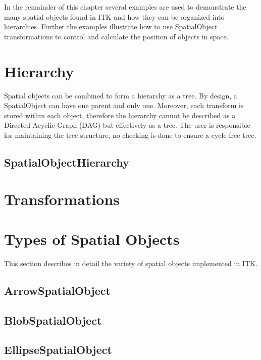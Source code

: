 In the remainder of this chapter several examples are used to demonstrate
the many spatial objects found in ITK and how they can be organized into
hierarchies. Further the examples
illustrate how to use SpatialObject transformations to control and
calculate the position of objects in space.

\section{Hierarchy}

Spatial objects can be combined to form a hierarchy as a tree. By design, a SpatialObject can
have one parent and only one. Moreover, each transform is stored within each object,
therefore the hierarchy cannot
be described as a Directed Acyclic Graph (DAG) but effectively as a tree.
The user is responsible for maintaining the tree structure, no checking is done
to ensure a cycle-free tree.

\subsection{SpatialObjectHierarchy}%
\label{sec:SpatialObjectHierarchy}



\section{Transformations}%
\label{sec:SpatialObjectTransforms}



\section{Types of Spatial Objects}%
\label{sec:Principal Objects}

This section describes in detail the variety of spatial objects
implemented in ITK.

\subsection{ArrowSpatialObject}%
\label{sec:ArrowSpatialObject}



\subsection{BlobSpatialObject}%
\label{sec:BlobSpatialObject}



\subsection{EllipseSpatialObject}%
\label{sec:EllipseSpatialObject}



